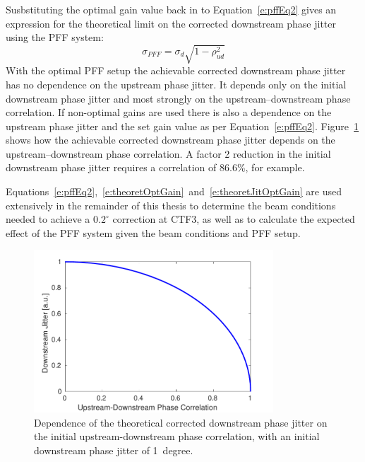 Susbstituting the optimal gain value back in to Equation~\ref{e:pffEq2} gives an expression for the theoretical limit on the corrected downstream phase jitter using the PFF system:
\begin{equation}
\sigma_{PFF} = \sigma_d\sqrt{1-\rho_{ud}^2}
\label{e:theoretJitOptGain}
\end{equation}
With the optimal PFF setup the achievable corrected downstream phase jitter has no dependence on the upstream phase jitter. It depends only on the initial downstream phase jitter and most strongly on the upstream--downstream phase correlation. If non-optimal gains are used there is also a dependence on the upstream phase jitter and the set gain value as per Equation~\ref{e:pffEq2}. Figure~\ref{f:theoretJitvsCorr} shows how the achievable corrected downstream phase jitter depends on the upstream--downstream phase correlation. A factor 2 reduction in the initial downstream phase jitter requires a correlation of 86.6\%, for example.

Equations~\ref{e:pffEq2},~\ref{e:theoretOptGain}~and~\ref{e:theoretJitOptGain} are used extensively in the remainder of this thesis to determine the beam conditions needed to achieve a \(0.2^\circ\) correction at CTF3, as well as to calculate the expected effect of the PFF system given the beam conditions and PFF setup.

\begin{figure}
  \centering
  \includegraphics[width=0.8\textwidth]{Figures/propagation/theoretJitvsCorr}
  \caption{Dependence of the theoretical corrected downstream phase jitter on the initial upstream-downstream phase correlation, with an initial downstream phase jitter of 1~degree.}
  \label{f:theoretJitvsCorr}
\end{figure}


